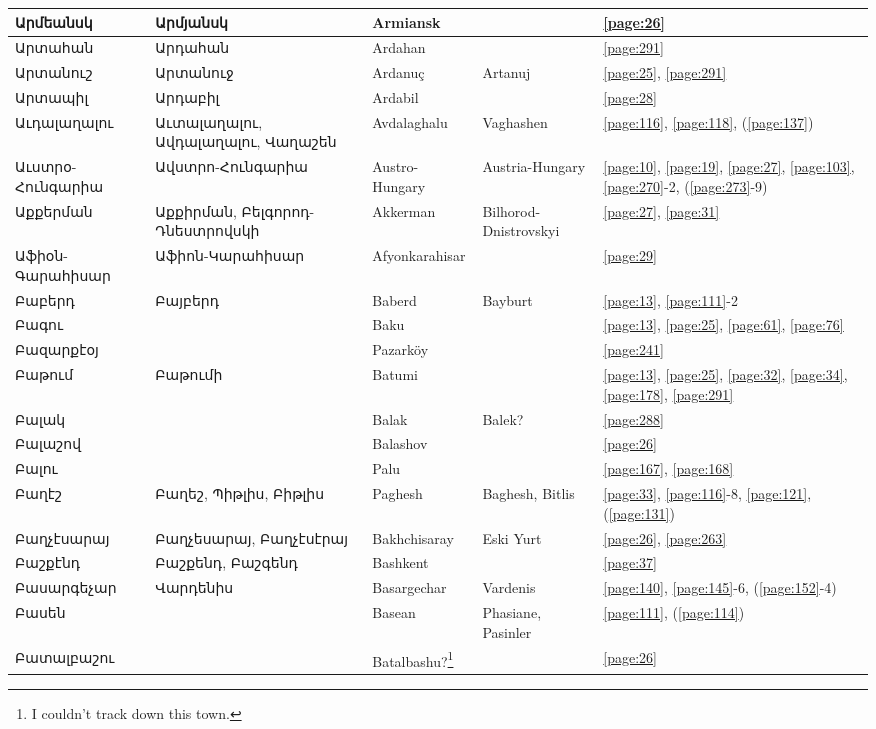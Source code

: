 \begin{center}
\begin{longtable}{|p{}|p{3cm}|p{3cm}|p{2cm}|p{3cm}|}
Արմեանսկ&Արմյանսկ
&Armiansk & &\ref{page:26}\\ \hline
Արտահան&Արդահան & 
{Ardahan}&&\ref{page:291}\\ \hline
Արտանուշ&Արտանուջ 
& {Ardanuç}& Artanuj&\ref{page:25}, \ref{page:291}\\ \hline
Արտապիլ& Արդաբիլ&
{Ardabil}& &\ref{page:28}\\ \hline
Աւդալաղալու&Աւտալաղալու, Ավդալաղալու, Վաղաշեն &
{Avdalaghalu}&Vaghashen &\ref{page:116}, \ref{page:118}, (\ref{page:137})\\ \hline
Աւստրօ-Հունգարիա&Ավստրո-Հունգարիա
&Austro-Hungary &Austria-Hungary &\ref{page:10}, \ref{page:19}, \ref{page:27}, \ref{page:103}, \ref{page:270}-2, (\ref{page:273}-9)\\ \hline
Աքքերման&Աքքիրման,  Բելգորոդ-Դնեստրովսկի&
{Akkerman}& Bilhorod-Dnistrovskyi&\ref{page:27}, \ref{page:31}\\ \hline
Աֆիօն-Գարահիսար&Աֆիոն-Կարահիսար
& Afyonkarahisar& &\ref{page:29}\\ \hline
Բաբերդ& Բայբերդ&
{Baberd} &Bayburt &\ref{page:13}, \ref{page:111}-2\\ \hline
Բագու& &
Baku& &\ref{page:13}, \ref{page:25}, \ref{page:61}, \ref{page:76}\\ \hline
Բազարքէօյ&  
&Pazarköy& &\ref{page:241}\\ \hline
Բաթում& Բաթումի& 
{Batumi}& &\ref{page:13}, \ref{page:25}, \ref{page:32}, \ref{page:34}, \ref{page:178}, \ref{page:291}\\ \hline
Բալակ& & 
Balak & Balek?&\ref{page:288}\\ \hline
Բալաշով& &  {Balashov}& &\ref{page:26}\\ \hline
Բալու& &
{Palu}& &\ref{page:167}, \ref{page:168}\\ \hline
Բաղէշ& Բաղեշ, Պիթլիս,  Բիթլիս & {Paghesh}&Baghesh, Bitlis &\ref{page:33}, \ref{page:116}-8, \ref{page:121}, (\ref{page:131})\\ \hline
Բաղչէսարայ& Բաղչեսարայ, Բաղչէսէրայ&{Bakhchisaray} & Eski Yurt&\ref{page:26}, \ref{page:263}\\ \hline
Բաշքէնդ &Բաշքենդ, Բաշգենդ &{Bashkent} & &\ref{page:37}\\ \hline
Բասարգեչար& Վարդենիս &
{Basargechar}&Vardenis &\ref{page:140}, \ref{page:145}-6, (\ref{page:152}-4)\\ \hline
Բասեն& &Basean & 
{Phasiane},     Pasinler &\ref{page:111}, (\ref{page:114})\\ \hline
Բատալբաշու& &
{Batalbashu?}\footnote{I couldn't track down this town. }& &\ref{page:26}\\ \hline

\end{longtable}
\end{center}
